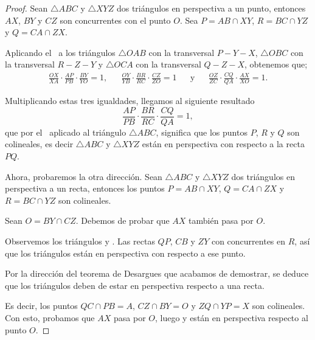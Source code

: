 \begin{proof}
    Sean $\triangle ABC$ y $\triangle XYZ$ dos triángulos en perspectiva a un punto, entonces $AX$, $BY$ y $CZ$ son concurrentes con el punto $O$.
    Sea $P = AB \cap XY$, $R = BC \cap YZ$ y $Q = CA \cap ZX$.

    \begin{figure}[H]
        \centering
        
    \end{figure}

    Aplicando el~ a los triángulos $\triangle OAB$ con la transversal $P - Y - X$, $\triangle OBC$ con la transversal $R - Z - Y$ y $\triangle OCA$ con la transversal $Q - Z - X$, obtenemos que;
    \begin{align*}
        \frac{OX}{XA} \cdot \frac{AP}{PB} \cdot \frac{BY}{YO} = 1,&&
        \frac{OY}{YB} \cdot \frac{BR}{RC} \cdot \frac{CZ}{ZO} = 1 && \text{y} &&
        \frac{OZ}{ZC} \cdot \frac{CQ}{QA} \cdot \frac{AX}{XO} = 1.
    \end{align*}

    Multiplicando estas tres igualdades, llegamos al siguiente resultado
    \[
        \frac{AP}{PB} \cdot \frac{BR}{RC} \cdot \frac{CQ}{QA} = 1,
    \]
    que por el~ aplicado al triángulo $\triangle ABC$, significa que los puntos $P$, $R$ y $Q$ son colineales, es decir $\triangle ABC$ y $\triangle XYZ$ están en perspectiva con respecto a la recta $PQ$.

    Ahora, probaremos la otra dirección.
    Sean $\triangle ABC$ y $\triangle XYZ$ dos triángulos en perspectiva a un recta, entonces los puntos $P = AB \cap XY$, $Q = CA \cap ZX$ y $R = BC \cap YZ$ son colineales.

    \begin{figure}[H]
        \centering
        
    \end{figure}

    Sean $O = BY \cap CZ$.
    Debemos de probar que $AX$ también pasa por $O$.

    Observemos los triángulos  y .
    Las rectas $QP$, $CB$ y $ZY$ con concurrentes en $R$, así que los triángulos están en perspectiva con respecto a ese punto.

    Por la dirección del teorema de Desargues que acabamos de demostrar, se deduce que los triángulos deben de estar en perspectiva respecto a una recta.

    Es decir, los puntos $QC \cap PB = A$, $CZ \cap BY = O$ y $ZQ \cap YP = X$ son colineales.
    Con esto, probamos que $AX$ pasa por $O$, luego  y  están en perspectiva respecto al punto $O$.
\end{proof}



